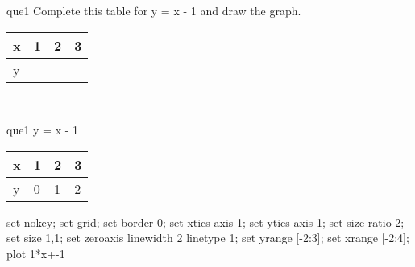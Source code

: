 \documentclass[13.5pt, varwidth=true]{beamer}
\begin{document}
\begin{frame}[shrink=19,fragile]
	\begin{beamercolorbox}[rounded=true, left, shadow=true,wd=14.8cm]{que1}
		 Complete this table for y = x - 1 and draw the graph. \\[0.3cm] \renewcommand{\arraystretch}{1.2}\begin{tabular}{|C|C|C|C|} \hline x & 1 & 2 & 3 \\ \hline y & & & \\ \hline \end{tabular}\\[0.3cm]
	\end{beamercolorbox}
\end{frame}
\begin{frame}[shrink=19,fragile]
	\begin{beamercolorbox}[rounded=true, left, shadow=true,wd=14.8cm]{que1}
		y = x - 1\renewcommand{\arraystretch}{1.2}\begin{tabular}{|C|C|C|C|} \hline x & 1 & 2 & 3 \\ \hline y & 0 & 1 & 2\\ \hline \end{tabular}\begin{gnuplot}[terminal=pdf] set nokey; set grid; set border 0; set xtics axis 1; set ytics axis 1; set size ratio 2; set size 1,1; set zeroaxis linewidth 2 linetype 1; set yrange [-2:3]; set xrange [-2:4]; plot 1*x+-1 \end{gnuplot}
	\end{beamercolorbox}
\end{frame}
\end{document}
